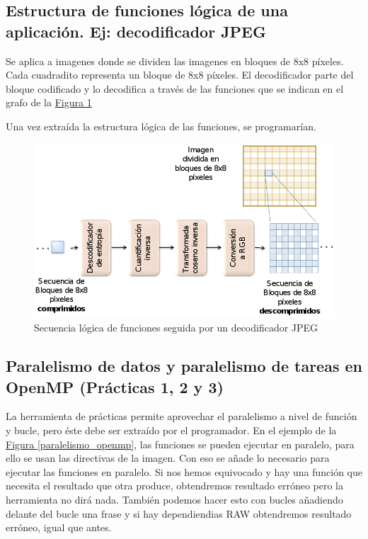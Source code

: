 \documentclass[10pt,a4paper,spanish]{report}
\begin{document}
\textcolor[rgb]{0.2,0.4,0.8}{\subsection{Estructura de funciones lógica de una aplicación. Ej: decodificador JPEG}}

Se aplica a imagenes donde se dividen las imagenes en bloques de 8x8 píxeles. Cada cuadradito representa un bloque de 8x8 píxeles. El decodificador parte del bloque codificado y lo decodifica a través de las funciones que se indican en el grafo de la \hyperref[decodificador_jpeg]{Figura \ref*{decodificador_jpeg}}

Una vez extraída la estructura lógica de las funciones, se programarían.

\begin{figure}[!h]
\centering
\includegraphics[width=1\textwidth]{2}
\caption{Secuencia lógica de funciones seguida por un decodificador JPEG}
\label{decodificador_jpeg}
\end{figure}

\textcolor[rgb]{0.2,0.4,0.8}{\subsection{Paralelismo de datos y paralelismo de tareas en OpenMP (Prácticas 1, 2 y 3)}}

La herramienta de prácticas permite aprovechar el paralelismo a nivel de función y bucle, pero éste debe ser extraído por el programador. En el ejemplo de la \hyperref[paralelismo_openmp]{Figura \ref*{paralelismo_openmp}}, las funciones se pueden ejecutar en paralelo, para ello se usan las directivas de la imagen. Con eso se añade lo necesario para ejecutar las funciones en paralelo. Si nos hemos equivocado y hay una función que necesita el resultado que otra produce, obtendremos resultado erróneo pero la herramienta no dirá nada. También podemos hacer esto con bucles añadiendo delante del bucle una frase y si hay dependiendias RAW obtendremos resultado erróneo, igual que antes.
\end{document}
